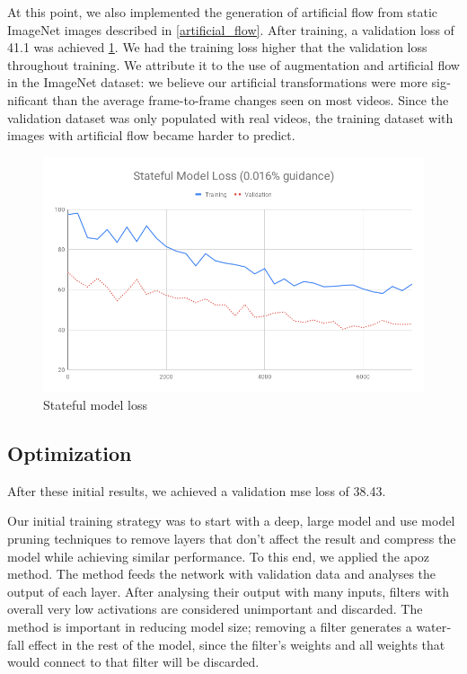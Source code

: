 \documentclass[12pt,openright,oneside,a4paper,english]{abntex2}
\begin{document}
\begin{otherlanguage}{english}
    At this point, we also implemented the generation of artificial flow from static ImageNet images described in \ref{artificial_flow}. After training, a validation loss of 41.1 was achieved \ref{loss_stateful}. We had the training loss higher that the validation loss throughout training. We attribute it to the use of augmentation and artificial flow in the ImageNet dataset: we believe our artificial transformations were more significant than the average frame-to-frame changes seen on most videos. Since the validation dataset was only populated with real videos, the training dataset with images with artificial flow became harder to predict.

    \begin{figure}[!htb]
    \centering
    \includegraphics[width=\textwidth]{loss/Stateful}
    \caption{Stateful model loss}
    \label{loss_stateful}
    \end{figure}

    \subsection{Optimization}
    After these initial results, we achieved a validation \acrshort{mse} loss of 38.43.

    Our initial training strategy was to start with a deep, large model and use model pruning techniques to remove layers that don't affect the result and compress the model while achieving similar performance. To this end, we applied the \acrfull{apoz} method. The method feeds the network with validation data and analyses the output of each layer. After analysing their output with many inputs, filters with overall very low activations are considered unimportant and discarded. The method is important in reducing model size; removing a filter generates a waterfall effect in the rest of the model, since the filter's weights and all weights that would connect to that filter will be discarded.


\end{otherlanguage}
\end{document}
